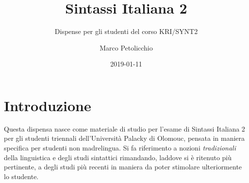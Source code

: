 \documentclass[a4paper,twoside,11pt,chapterprefix=false,bibliography=totocnumbered,listof=flat]{scrbook}
\title{Sintassi Italiana 2}
\subtitle{Dispense per gli studenti del corso KRI/SYNT2}
\author{Marco Petolicchio}
\date{2019-01-11}
\makeatletter
\newcommand\HUGE{\@setfontsize\Huge{36}{48}}
\makeatother
\begin{document}
\maketitle

\makeatletter
{}
\makeatother
\nopagecolor%
\pagecolor{white}

{
\setcounter{tocdepth}{1}
\tableofcontents
}
\listoftables
\listoffigures
\hypertarget{introduzione}{%
\chapter*{Introduzione}\label{introduzione}}

Questa dispensa nasce come materiale di studio per l'esame di Sintassi
Italiana 2 per gli studenti triennali dell'Università Palacky di
Olomouc, pensata in maniera specifica per studenti non madrelingua. Si
fa riferimento a nozioni \emph{tradizionali} della linguistica e degli
studi sintattici rimandando, laddove si è ritenuto più pertinente, a
degli studi più recenti in maniera da poter stimolare ulteriormente lo
studente.
\end{document}
